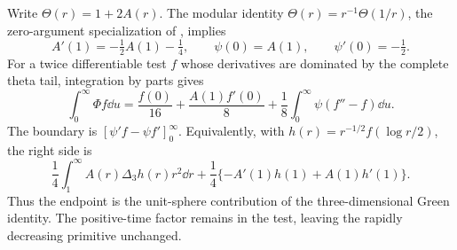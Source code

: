 Write $\Theta(r)=1+2A(r)$. The modular identity
$\Theta(r)=r^{-1}\Theta(1/r)$, the zero-argument specialization of
\cite[20.7.32]{DLMFThetaModular}, implies
\begin{equation}\label{eq:primitiveendpoint}
 A'(1)=-\tfrac12A(1)-\tfrac14,\qquad
 \psi(0)=A(1),\qquad \psi'(0)=-\tfrac12.
\end{equation}
For a twice differentiable test $f$ whose derivatives are dominated by
the complete theta tail, integration by parts gives
\begin{equation}\label{eq:primitiveGreen}
 \int_0^\infty\Phi f\dd u
 =\frac{f(0)}{16}+\frac{A(1)f'(0)}8
   +\frac18\int_0^\infty\psi(f''-f)\dd u.
\end{equation}
The boundary is $[\psi'f-\psi f']_0^\infty$. Equivalently, with
$h(r)=r^{-1/2}f(\log r/2)$, the right side is
\begin{equation}\label{eq:primitiveRadialGreen}
 \frac14\int_1^\infty A(r)\Delta_3h(r)r^2\dd r
 +\frac14\{-A'(1)h(1)+A(1)h'(1)\}.
\end{equation}
Thus the endpoint is the unit-sphere contribution of the three-dimensional
Green identity. The positive-time factor remains in the test, leaving the
rapidly decreasing primitive unchanged.

